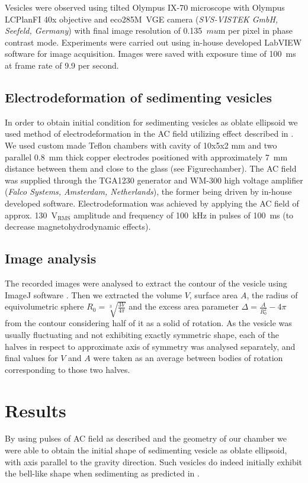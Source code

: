 \documentclass[10pt,a4paper,draft]{article}
\begin{document}
Vesicles were observed using tilted Olympus IX-70 microscope with Olympus LCPlanFI 40x objective and eco285M~VGE camera \newline (\emph{SVS-VISTEK GmbH, Seefeld, Germany}) with final image resolution of 0.135~$mu$m per pixel in phase contrast mode.
Experiments were carried out using in-house developed LabVIEW software for image acquisition. Images were saved with exposure time of 100~ms at frame rate of 9.9 per second.

\subsection{Electrodeformation of sedimenting vesicles}

In order to obtain initial condition for sedimenting vesicles as oblate ellipsoid we used method of electrodeformation in the AC field utilizing effect described in \cite{Aranda2008}.
We used custom made Teflon chambers with cavity of 10x5x2 mm and two parallel 0.8~mm thick copper electrodes positioned with approximately 7~mm distance between them and close to the glass (see Figure{chamber}).
The AC field was supplied through the TGA1230 generator and WM-300 high voltage amplifier (\emph{Falco Systems, Amsterdam, Netherlands}), the former being driven by in-house developed software.
Electrodeformation was achieved by applying the AC field of approx. 130~V$_\mathrm{RMS}$ amplitude and frequency of 100~kHz in pulses of 100~ms (to decrease magnetohydrodynamic effects).

\subsection{Image analysis}
The recorded images were analysed to extract the contour of the vesicle using ImageJ software \cite{ImageJ}.
Then we extracted the volume $V$, surface area $A$, the radius of equivolumetric sphere $R_0 = \sqrt[3]{\frac{3V}{4\pi}}$ and the excess area parameter $\Delta = \frac{A}{R_0^2} - 4\pi$ from the contour considering half of it as a solid of rotation.
As the vesicle was usually fluctuating and not exhibiting exactly symmetric shape, each of the halves in respect to approximate axis of symmetry was analysed separately, and final values for $V$ and $A$ were taken as an average between bodies of rotation corresponding to those two halves.

\section{Results}\label{results}
By using pulses of AC field as described and the geometry of our chamber we were able to obtain the initial shape of sedimenting vesicle as oblate ellipsoid, with axis parallel to the gravity direction.
Such vesicles do indeed initially exhibit the bell-like shape when sedimenting as predicted in \cite{Boedec2012}.
\end{document}
